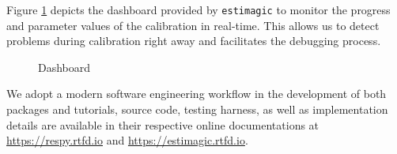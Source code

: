 \noindent Figure \ref{Dashboard} depicts the dashboard provided by \verb+estimagic+ to monitor the progress and parameter values of the calibration in real-time. This allows us to detect problems during calibration right away and facilitates the debugging process.

\begin{figure}[h!]\centering
\caption{Dashboard}\label{Dashboard}
\end{figure}\FloatBarrier

\noindent We adopt a modern software engineering workflow in the development of both packages and tutorials, source code, testing harness, as well as implementation details are available in their respective online documentations at \url{https://respy.rtfd.io} and \url{https://estimagic.rtfd.io}.
